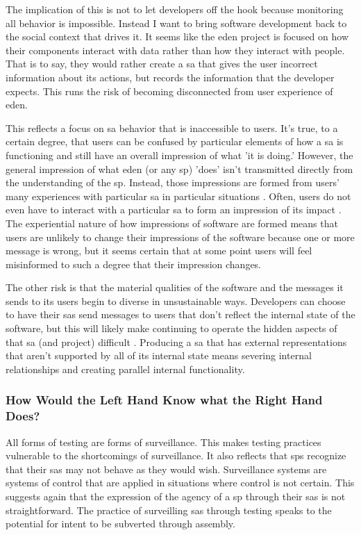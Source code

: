 \documentclass[a4paper,man,natbib,floatsintext]{apa6}
\begin{document}
   The implication of this is not to let developers off the hook because monitoring all behavior is impossible. Instead I want to bring software development back to the social context that drives it. It seems like the \acrshort{eden} project is focused on how their components interact with data rather than how they interact with people. That is to say, they would rather create a \gls{sa} that gives the user incorrect information about its actions, but records the information that the developer expects. This runs the risk of becoming disconnected from user experience of \acrshort{eden}\footnotemark.


   This reflects a focus on \gls{sa} behavior that is inaccessible to users. It's true, to a certain degree, that users can be confused by particular elements of how a \gls{sa} is functioning and still have an overall impression of what 'it is doing.' However, the general impression of what \acrshort{eden} (or any \gls{sp}) 'does' isn't transmitted directly from the understanding of the \gls{sp}. Instead, those impressions are formed from users' many experiences with particular \gls{sa} in particular situations \citep{Boellstorff2015-al,Eubanks2018-hc,Schull2012-nc}. Often, users do not even have to interact with a particular \gls{sa} to form an impression of its impact \citep{Kitchin2011-af}. The experiential nature of how impressions of software are formed means that users are unlikely to change their impressions of the software because one or more message is wrong, but it seems certain that at some point users will feel misinformed to such a degree that their impression changes.

   The other risk is that the material qualities of the software and the messages it sends to its users begin to diverse in unsustainable ways. Developers can choose to have their \glspl{sa} send messages to users that don't reflect the internal state of the software, but this will likely make continuing to operate the hidden aspects of that \gls{sa} (and project) difficult \citep{Bivens2017-tc}. Producing a \gls{sa} that has external representations that aren't supported by all of its internal state means severing internal relationships and creating parallel internal functionality. 

   \subsubsection{How Would the Left Hand Know what the Right Hand Does?}
   All forms of testing are forms of surveillance. This makes testing practices vulnerable to the shortcomings of surveillance\footnotemark. It also reflects that \glspl{sp} recognize that their \glspl{sa} may not behave as they would wish. Surveillance systems are systems of control that are applied in situations where control is not certain. This suggests again that the expression of the agency of a \gls{sp} through their \glspl{sa} is not straightforward. The practice of surveilling \glspl{sa} through testing speaks to the potential for intent to be subverted through assembly. 
\end{document}
